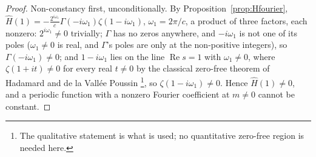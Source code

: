 \documentclass[11pt]{article}
\theoremstyle{definition}
\theoremstyle{remark}
\begin{document}
\begin{proof}
Non-constancy first, unconditionally. By Proposition~\ref{prop:Hfourier},
$\hat H(1) = -\frac{2^{i\omega_1}}{c}\Gamma(-i\omega_1)\zeta(1-i\omega_1)$, $\omega_1 = 2\pi/c$, a
product of three factors, each nonzero: $2^{i\omega_1}\ne0$ trivially; $\Gamma$ has no zeros
anywhere, and $-i\omega_1$ is not one of its poles ($\omega_1\ne0$ is real, and $\Gamma$'s poles are
only at the non-positive integers), so $\Gamma(-i\omega_1)\ne0$; and $1-i\omega_1$ lies on the line
$\operatorname{Re}s=1$ with $\omega_1\ne0$, where $\zeta(1+it)\ne0$ for every real $t\ne0$ by the
classical zero-free theorem of Hadamard \cite{Hadamard1896} and de la
Vall\'ee Poussin \cite{ValleePoussin1896}\footnote{The qualitative
statement is what is used; no quantitative zero-free region is needed
here.}, so
$\zeta(1-i\omega_1)\ne0$. Hence $\hat H(1)\ne0$, and a periodic function with a nonzero Fourier
coefficient at $m\ne0$ cannot be constant.


\end{proof}
\end{document}
